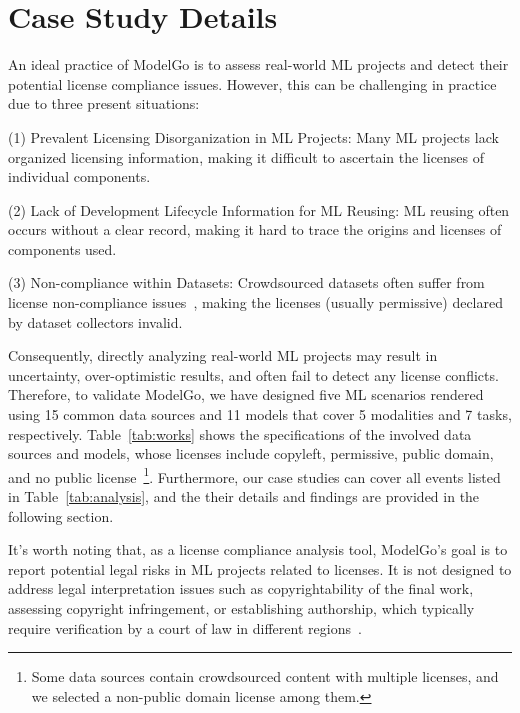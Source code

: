\section{Case Study Details}
An ideal practice of ModelGo is to assess real-world ML projects and detect their potential license compliance issues. 
However, this can be challenging in practice due to three present situations:

(1) Prevalent Licensing Disorganization in ML Projects: Many ML projects lack organized licensing information, making it difficult to ascertain the licenses of individual components.

(2) Lack of Development Lifecycle Information for ML Reusing: ML reusing often occurs without a clear record, making it hard to trace the origins and licenses of components used.

(3) Non-compliance within Datasets: Crowdsourced datasets often suffer from license non-compliance issues~\cite{rajbahadur2021can}, making the licenses (usually permissive) declared by dataset collectors invalid.

Consequently, directly analyzing real-world ML projects may result in uncertainty, over-optimistic results, and often fail to detect any license conflicts.
Therefore, to validate ModelGo, we have designed five ML scenarios rendered using 15 common data sources and 11 models that cover 5 modalities and 7 tasks, respectively.
Table~\ref{tab:works} shows the specifications of the involved data sources and models, whose licenses include copyleft, permissive, public domain, and no public license~\footnote{Some data sources contain crowdsourced content with multiple licenses, and we selected a non-public domain license among them.}.
Furthermore, our case studies can cover all events listed in Table~\ref{tab:analysis}, and the their details and findings are provided in the following section.

It's worth noting that, as a license compliance analysis tool, ModelGo's goal is to report potential legal risks in ML projects related to licenses.
It is not designed to address legal interpretation issues such as copyrightability of the final work, assessing copyright infringement, or establishing authorship, which typically require verification by a court of law in different regions~\cite{national1979final, hedrick2019ithink, margoni2018artificial}.


